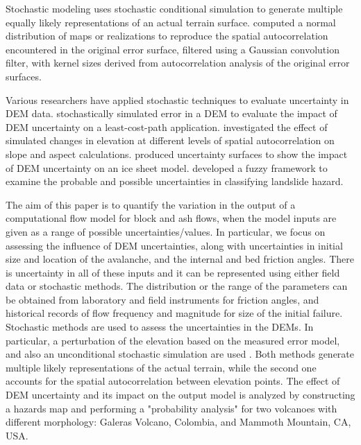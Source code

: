 \documentclass[12pt]{article}
\begin{document}
Stochastic modeling uses stochastic conditional simulation to generate
multiple equally likely representations of an actual terrain
surface. \citet{Hunter_Goodchild_1997, Ehlschlaeger_1996} computed a
normal distribution of maps or realizations to reproduce the spatial
autocorrelation encountered in the original error surface, filtered
using a Gaussian convolution filter, with kernel sizes derived from
autocorrelation analysis of the original error surfaces.

Various researchers have applied stochastic techniques to evaluate
uncertainty in DEM data. \citet{Ehlschlaeger_1996} stochastically
simulated error in a DEM to evaluate the impact of DEM uncertainty on
a least-cost-path application. \citet{Hunter_Goodchild_1997}
investigated the effect of simulated changes in elevation at different
levels of spatial autocorrelation on slope and aspect
calculations. \citet{Felix_Hebeler} produced uncertainty surfaces to
show the impact of DEM uncertainty on an ice sheet
model. \citet{Amii_Darnell} developed a fuzzy framework to examine the
probable and possible uncertainties in classifying landslide hazard.

The aim of this paper is to quantify the variation in the output of a
computational flow model for block and ash flows, when the model
inputs are given as a range of possible uncertainties/values.  In
particular, we focus on assessing the influence of DEM uncertainties,
along with uncertainties in initial size and location of the
avalanche, and the internal and bed friction angles. There is
uncertainty in all of these inputs and it can be represented using
either field data or stochastic methods.  The distribution or the
range of the parameters can be obtained from laboratory and field
instruments for friction angles, and historical records of flow
frequency and magnitude for size of the initial failure.  Stochastic
methods are used to assess the uncertainties in the DEMs.  In
particular, a perturbation of the elevation based on the measured
error model, and also an unconditional stochastic simulation are used
\citep{Ehlschlaeger_1996}.  Both methods generate multiple likely
representations of the actual terrain, while the second one accounts
for the spatial autocorrelation between elevation points.  The effect
of DEM uncertainty and its impact on the output model is analyzed by
constructing a hazards map and performing a "probability analysis" for
two volcanoes with different morphology: Galeras Volcano, Colombia,
and Mammoth Mountain, CA, USA.
\end{document}
